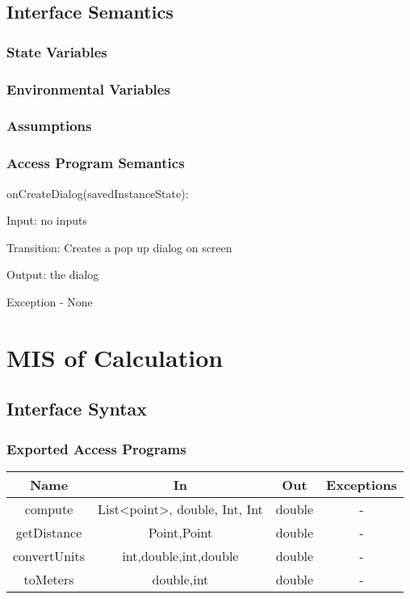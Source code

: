 \documentclass[12,english]{article}
\begin{document}
	\subsection{Interface Semantics}
		\subsubsection{State Variables}
		
		\subsubsection{Environmental Variables}
		
		\subsubsection{Assumptions}
			
		\subsubsection{Access Program Semantics}

onCreateDialog(savedInstanceState):

		Input: no inputs
		
		Transition: Creates a pop up dialog on screen
		
		Output: the dialog
		
		Exception - None\\
		



\section{MIS of Calculation}
	\subsection{Interface Syntax}
		\subsubsection{Exported Access Programs}
		
	\begin{tabular}[pos]{|c|c|c|c|}
	\hline
	\textbf{Name}& \textbf{In} & \textbf{Out} & \textbf{Exceptions} \\ 
	\hline
	compute & List<point>, double, Int, Int & double & -\\ 
	\hline
	getDistance & Point,Point & double & -\\ 
	\hline
	convertUnits & int,double,int,double & double & -\\ 
	\hline
	toMeters & double,int & double & -\\ 
	\hline
		
	\end{tabular}		
		
\end{document}
